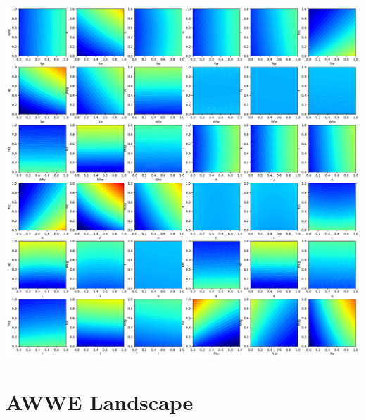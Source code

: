 \documentclass[
  letterpaper,
  DIV=11,
  numbers=noendperiod]{scrreprt}
\begin{document}
\includegraphics{002_awwe_files/figure-pdf/cell-14-output-1.pdf}

\section{AWWE Landscape}\label{awwe-landscape}
\end{document}
